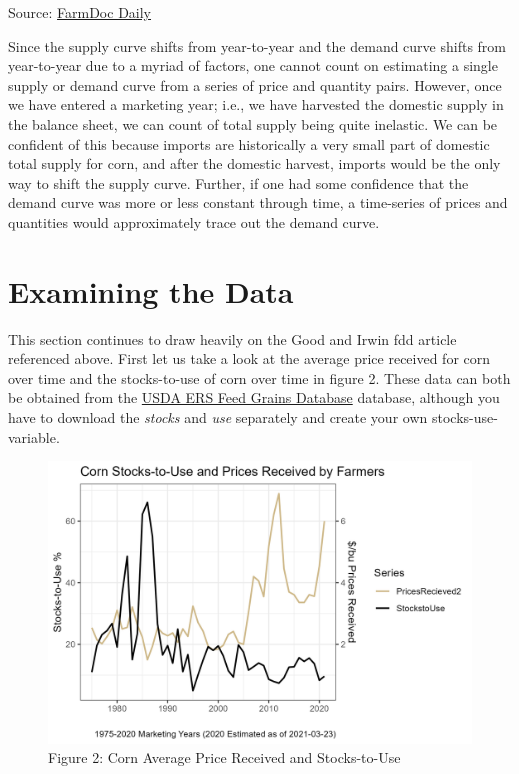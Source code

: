 \documentclass[
  letterpaper,
  DIV=11,
  numbers=noendperiod]{scrreprt}
\begin{document}
Source:
\href{http://farmdocdaily.illinois.edu/2015/04/relationship-stock-to-use-and-corn-prices.html}{FarmDoc
Daily}

Since the supply curve shifts from year-to-year and the demand curve
shifts from year-to-year due to a myriad of factors, one cannot count on
estimating a single supply or demand curve from a series of price and
quantity pairs. However, once we have entered a marketing year; i.e., we
have harvested the domestic supply in the balance sheet, we can count of
total supply being quite inelastic. We can be confident of this because
imports are historically a very small part of domestic total supply for
corn, and after the domestic harvest, imports would be the only way to
shift the supply curve. Further, if one had some confidence that the
demand curve was more or less constant through time, a time-series of
prices and quantities would approximately trace out the demand curve.

\hypertarget{examining-the-data}{%
\section{Examining the Data}\label{examining-the-data}}

This section continues to draw heavily on the Good and Irwin fdd article
referenced above. First let us take a look at the average price received
for corn over time and the stocks-to-use of corn over time in figure 2.
These data can both be obtained from the
\href{http://www.ers.usda.gov/data-products/feed-grains-database.aspx}{USDA
ERS Feed Grains Database} database, although you have to download the
\emph{stocks} and \emph{use} separately and create your own
stocks-use-variable.

\begin{figure}

{\centering \includegraphics{assets/EndingStocksand-StocksUsePrices.png}

}

\caption{Figure 2: Corn Average Price Received and Stocks-to-Use}

\end{figure}
\end{document}
